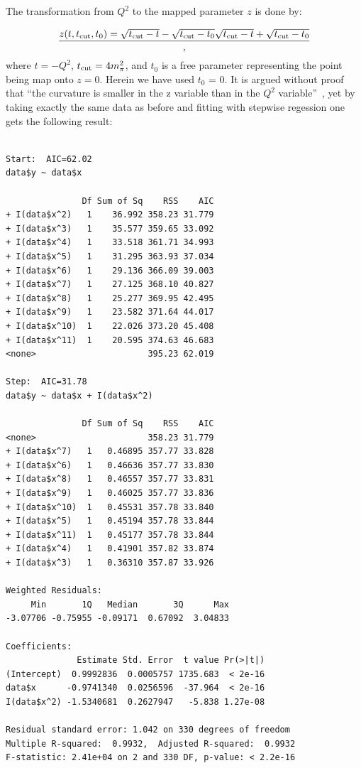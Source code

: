\documentclass[10pt,aps,prc,twocolumn]{revtex4-1}
\begin{document}
\begin{appendix}
The transformation from $Q^2$ to the mapped parameter $z$ is done by:

\begin{equation}
\frac{ z(t,t_{\rm cut},t_0) = {\sqrt{t_{\rm cut} - t} - \sqrt{t_{\rm cut} - t_0} }{ \sqrt{t_{\rm cut} - t} + \sqrt{t_{\rm cut} - t_0}  } },  
\end{equation}
where $t=-Q^2$, $t_{\rm cut} = 4m_\pi^2$, and $t_0$ is a free parameter 
representing the point being map onto $z=0$.   
Herein we have used $t_0$ = 0.  
It is argued without proof that ``the curvature is smaller in the
z variable than in the $Q^2$ variable''~\cite{Hill:2010yb}, yet by taking 
exactly the same data as before and fitting with stepwise regession
one gets the following result:

\begin{Verbatim}[fontsize=\footnotesize]

Start:  AIC=62.02
data$y ~ data$x

               Df Sum of Sq    RSS    AIC
+ I(data$x^2)   1    36.992 358.23 31.779
+ I(data$x^3)   1    35.577 359.65 33.092
+ I(data$x^4)   1    33.518 361.71 34.993
+ I(data$x^5)   1    31.295 363.93 37.034
+ I(data$x^6)   1    29.136 366.09 39.003
+ I(data$x^7)   1    27.125 368.10 40.827
+ I(data$x^8)   1    25.277 369.95 42.495
+ I(data$x^9)   1    23.582 371.64 44.017
+ I(data$x^10)  1    22.026 373.20 45.408
+ I(data$x^11)  1    20.595 374.63 46.683
<none>                      395.23 62.019

Step:  AIC=31.78
data$y ~ data$x + I(data$x^2)

               Df Sum of Sq    RSS    AIC
<none>                      358.23 31.779
+ I(data$x^7)   1   0.46895 357.77 33.828
+ I(data$x^6)   1   0.46636 357.77 33.830
+ I(data$x^8)   1   0.46557 357.77 33.831
+ I(data$x^9)   1   0.46025 357.77 33.836
+ I(data$x^10)  1   0.45531 357.78 33.840
+ I(data$x^5)   1   0.45194 357.78 33.844
+ I(data$x^11)  1   0.45177 357.78 33.844
+ I(data$x^4)   1   0.41901 357.82 33.874
+ I(data$x^3)   1   0.36310 357.87 33.926

Weighted Residuals:
     Min       1Q   Median       3Q      Max
-3.07706 -0.75955 -0.09171  0.67092  3.04833

Coefficients:
              Estimate Std. Error  t value Pr(>|t|)
(Intercept)  0.9992836  0.0005757 1735.683  < 2e-16 
data$x      -0.9741340  0.0256596  -37.964  < 2e-16 
I(data$x^2) -1.5340681  0.2627947   -5.838 1.27e-08 

Residual standard error: 1.042 on 330 degrees of freedom
Multiple R-squared:  0.9932,  Adjusted R-squared:  0.9932
F-statistic: 2.41e+04 on 2 and 330 DF, p-value: < 2.2e-16


\end{Verbatim}
\end{appendix}
\end{document}
